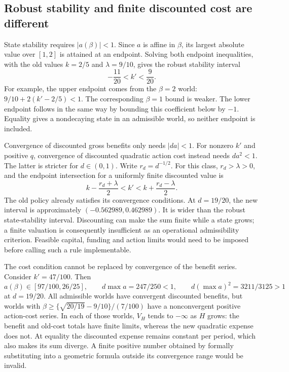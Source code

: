 \subsection{Robust stability and finite discounted cost are different}
\label{exec17:s6-rule-boundaries}

State stability requires $|a(\beta)|<1$. Since $a$ is affine in $\beta$,
its largest absolute value over $[1,2]$ is attained at an endpoint. Solving
both endpoint inequalities, with the old values $k=2/5$ and
$\lambda=9/10$, gives the robust stability interval
\begin{equation}
 -\frac{11}{20}<k'<\frac9{20}.
 \label{exec17:s6-robust-stability}
\end{equation}
For example, the upper endpoint comes from the $\beta=2$ world:
$9/10+2(k'-2/5)<1$. The corresponding $\beta=1$ bound is weaker.
The lower endpoint follows in the same way by bounding this coefficient
below by $-1$. Equality gives a nondecaying state in an admissible world,
so neither endpoint is included.

Convergence of discounted gross benefits only needs $|da|<1$.
For nonzero $k'$ and positive $q$, convergence of discounted quadratic
action cost instead needs $da^2<1$. The latter is stricter for
$d\in(0,1)$. Write $r_d=d^{-1/2}$. For this class, $r_d>\lambda>0$,
and the endpoint intersection for a uniformly finite discounted value is
\begin{equation}
 k-\frac{r_d+\lambda}{2}<k'<
 k+\frac{r_d-\lambda}{2}.
 \label{exec17:s6-robust-cost}
\end{equation}
The old policy already satisfies its convergence conditions. At
$d=19/20$, the new interval is approximately
$(-0.562989,0.462989)$. It is wider than the robust state-stability
interval. Discounting can make the sum finite while a state grows;
a finite valuation is consequently insufficient as an operational
admissibility criterion. Feasible capital, funding and action limits would
need to be imposed before calling such a rule implementable.

The cost condition cannot be replaced by convergence of the benefit
series. Consider $k'=47/100$. Then
\begin{equation}
 a(\beta)\in[97/100,26/25],\qquad
 d\max a=247/250<1,\qquad
 d(\max a)^2=3211/3125>1
 \label{exec17:s6-rule-divergence}
\end{equation}
at $d=19/20$. All admissible worlds have convergent discounted benefits,
but worlds with
$\beta\geq\{\sqrt{20/19}-9/10\}/(7/100)$ have a nonconvergent
positive action-cost series. In each of those worlds, $V_H$ tends to
$-\infty$ as $H$ grows: the benefit and old-cost totals have finite
limits, whereas the new quadratic expense does not. At equality the
discounted expense remains constant per period, which also makes its
sum diverge. A finite positive number obtained by formally substituting
into a geometric formula outside its convergence range would be invalid.

